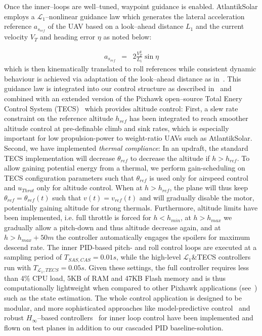Once the inner--loops are well--tuned, waypoint guidance is enabled. AtlantikSolar employs a $\mathcal{L}_1$--nonlinear guidance law which generates the lateral acceleration reference $a_{s_{ref}}$ of the UAV based on a look--ahead distance ${L}_1$ and the current velocity $V_T$ and heading error $\eta$ as noted below:

\small
\begin{eqnarray}
 a_{s_{ref}} &=& 2\frac{V_T^2}{L_1}\sin \eta
\end{eqnarray}
\normalsize
which is then kinematically translated to roll references while consistent dynamic behaviour is achieved via adaptation of the look--ahead distance as in~\cite{L1stabAnalysis}. This guidance law is integrated into our control structure as described in~\cite{OMLAS_MED_14} and combined with an extended version of the Pixhawk open--source Total Enery Control System (TECS)~\cite{PixhawkWebsite} which provides altitude control: First, a slew rate constraint on the reference altitude $h_{ref}$ has been integrated to reach smoother altitude control at pre-definable climb and sink rates, which is especially important for low propulsion-power to weight-ratio UAVs such as AtlantikSolar. Second, we have implemented \textit{thermal compliance}: In an updraft, the standard TECS implementation will decrease $\theta_{ref}$ to decrease the altitude if $h>h_{ref}$. To allow gaining potential energy from a thermal, we perform gain-scheduling on TECS configuration parameters such that $\theta_{ref}$ is used only for airspeed control and $u_{Throt}$ only for altitude control. When at $h>h_{ref}$, the plane will thus keep $\theta_{ref}=\theta_{ref}(t)$  such that $v(t)=v_{ref}(t)$ and will gradually disable the motor, potentially gaining altitude for strong thermals. Furthermore, altitude limits have been implemented, i.e. full throttle is forced for $h<h_{min}$, at $h>h_{max}$ we gradually allow a pitch-down and thus altitude decrease again, and at $h>h_{max}+50m$ the controller automatically engages the spoilers for maximum descend rate. The inner PID-based pitch- and roll control loops are executed at a sampling period of $T_{SAS,CAS}=0.01s$, while the high-level $\mathcal{L}_1$\&TECS controllers run with $T_{\mathcal{L}_1,TECS}=0.05s$. Given these settings, the full controller requires less than 4\% CPU load, 5KB of RAM and 47KB Flash memory and is thus computationally lightweight when compared to other Pixhawk applications (see~\cite{OMLAS_MED_14}) such as the state estimation. The whole control application is designed to be modular, and more sophisticated approaches like model-predictive control~\cite{OMLAS_MED_14} and robust $H_\infty$--based controllers~\cite{Mosimann_FT} for inner loop control have been implemented and flown on test planes in addition to our cascaded PID baseline-solution. 